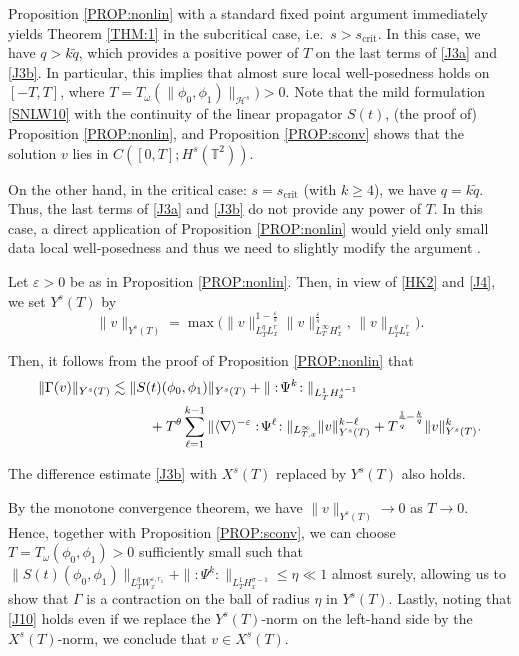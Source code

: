 \documentclass[letterpaper, 11pt,  reqno]{amsart}
\newcommand{\1}{\hspace{0.5mm}\text{I}\hspace{0.5mm}}
\newcommand{\noi}{\noindent}
\newcommand{\T}{\mathbb{T}}
\newcommand{\nb}{\nabla}
\newcommand{\eps}{\varepsilon}
\newcommand{\G}{\Gamma}
\newcommand{\s}{\sigma}
\newcommand{\wt}{\widetilde}
\renewcommand{\l}{\ell}
\renewcommand{\o}{\omega}
\newcommand{\les}{\lesssim}
\newcommand{\jb}[1]
{\langle #1 \rangle}
\renewcommand{\H}{\mathcal{H}}
\numberwithin{equation}{section}
\numberwithin{theorem}{section}
\begin{document}
Proposition \ref{PROP:nonlin}
with a standard fixed point argument
immediately yields Theorem \ref{THM:1}
in the subcritical case, i.e.~$s > s_\text{crit}$.
In this case, we have $ q> k \wt q$, which  provides a positive power of $T$
on  the last terms of \eqref{J3a} and \eqref{J3b}. 
In particular, this implies that almost sure local well-posedness
holds on $[-T, T]$, where  $T = T_\o(\|\phi_0, \phi_1)\|_{\H^s})> 0$.
Note that 
the mild formulation \eqref{SNLW10}
with  the continuity of the linear propagator $S(t)$,
(the proof of) Proposition \ref{PROP:nonlin},
and Proposition \ref{PROP:sconv}
shows that the solution $v$ lies in $C([0, T]; H^s(\T^2))$.

On the other hand, in the critical case:
$s = s_\text{crit}$ (with  $k \geq 4$), 
 we have $ q= k \wt q$.
 Thus,   the last terms of \eqref{J3a} and \eqref{J3b}
 do not provide any power of $T$.
In this case, a direct application of Proposition \ref{PROP:nonlin}
 would yield only small data local well-posedness
 and thus we need to slightly  modify the argument .


Let $\eps > 0$ be as in Proposition \ref{PROP:nonlin}.
Then,  in view of \eqref{HK2} and \eqref{J4}, 
we set $Y^s(T)$ by 
\[ \| v\|_{Y^s(T)} = \max \big(\|v \|_{L^{q}_TL^r_x}^{1-\frac{\eps}s}   \| v \|_{L^\infty_T H^s_x}^{\frac{\eps}s}  , \,
\|v \|_{L^{q}_TL^r_x}\big).\]


\noi
Then, it follows from the proof of Proposition \ref{PROP:nonlin} that 
\begin{align} 
\| \G(v) \|_{Y^s(T)} 
& \les
\|S(t)(\phi_0, \phi_1)\|_{Y^s(T)}
+ \| :\!\Psi^k\!: \|_{L^1_TH^{s-1}_x} \notag\\
& \hphantom{XXX}+   T^\theta \sum_{\l=1}^{k-1} \|\jb{\nb}^{-\eps} :\!\Psi^\l\!: \|_{L^\infty_{T, x}} 
\| v \|_{Y^s(T)}^{k-\l}  
 +  T^{\frac{1}{\wt q}-\frac kq} 
\| v \|_{Y^s(T)}^k .  
\label{J10}
\end{align}

\noi
The difference estimate \eqref{J3b} with $X^s(T)$ replaced by $Y^s(T)$ also holds.



By the monotone convergence theorem, 
we have $\| v\|_{Y^s(T)}\to 0$  as $T \to 0$.
Hence, together with Proposition \ref{PROP:sconv}, 
we can choose $T = T_\o(\phi_0, \phi_1)> 0$ sufficiently small such that 
$\|S(t) (\phi_0, \phi_1)\|_{L^q_T  W^{\eps, r_1}_x}
+\| \!:\!\Psi^k \!: \!\|_{L^1_TH^{\s-1}_x} 
\leq \eta  \ll1 $ almost surely, allowing us to show that 
$\G$ is a contraction on the ball of radius $\eta$ in $Y^s(T)$.
Lastly, noting that \eqref{J10} holds even if we replace the $Y^s(T)$-norm on the left-hand side
by the $X^s(T)$-norm, 
we conclude  that $v \in X^s(T)$.
\end{document}
